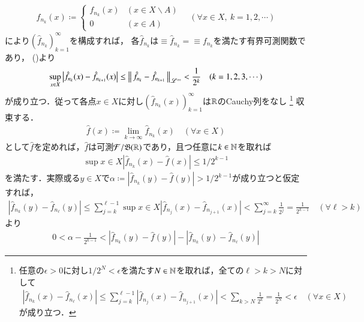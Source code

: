 \begin{prf}
\begin{description}
\begin{align}
				\hat{f}_{n_k}(x) \coloneqq
				\begin{cases}
					f_{n_k}(x) & (x \in X \backslash A) \\
					0 & (x \in A)
				\end{cases}
				\quad (\forall x \in X,\ k=1,2,\cdots)
			\end{align}
			により$\left( \hat{f}_{n_k} \right)_{k=1}^{\infty}$を構成すれば，
			各$\hat{f}_{n_k}$は$\equiv{\hat{f}_{n_k}}{} = \equiv{f_{n_k}}{}$を満たす有界可測関数であり，
			()より
			\begin{align}
				\operatorname*{sup}_{x \in X} \left|\hat{f}_{n_k}(x) - \hat{f}_{n_{k+1}}(x)\right|
				\leq \left\|\, \hat{f}_{n_k} - \hat{f}_{n_{k+1}}\, \right\|_{\mathscr{L}^\infty} < \frac{1}{2^k} \quad (k=1,2,3,\cdots) 
				\label{ineq:Lp_banach_1}
			\end{align}
			が成り立つ．従って各点$x \in X$に対し$\left( \hat{f}_{n_k}(x) \right)_{k=1}^{\infty}$は$\mathbb{R}$のCauchy列をなし
			\footnote{
				任意の$\epsilon > 0$に対し$1/2^N < \epsilon$を満たす$N \in \mathbb{N}$を取れば，全ての$\ell > k > N$に対して
				\begin{align}
					\left|\hat{f}_{n_k}(x) - \hat{f}_{n_{\ell}}(x)\right| 
					\leq \sum_{j=k}^{\ell-1}\left|\hat{f}_{n_j}(x) - \hat{f}_{n_{j+1}}(x)\right| 
					< \sum_{k > N} \frac{1}{2^k} = \frac{1}{2^N} < \epsilon
					\quad (\forall x \in X)
				\end{align}
				が成り立つ．
			}
			収束する．
			\begin{align}
				\hat{f}(x) \coloneqq \lim_{k \to \infty} \hat{f}_{n_k}(x)
				\quad (\forall x \in X)
			\end{align}
			として$\hat{f}$を定めれば，$\hat{f}$は可測$\mathcal{F}/\mathfrak{B}(\mathbb{R})$であり，且つ任意に$k \in \mathbb{N}$を取れば
			\begin{align}
				\sup{x \in X}{|\hat{f}_{n_k}(x) - \hat{f}(x)|} \leq 1/2^{k-1} \label{ineq:Lp_banach_3}
			\end{align}
			を満たす．実際或る$y \in X$で$\alpha \coloneqq |\hat{f}_{n_k}(y) - \hat{f}(y)| > 1/2^{k-1}$が成り立つと仮定すれば，
			\begin{align}
				\left| \hat{f}_{n_k}(y) - \hat{f}_{n_\ell}(y) \right|
				\leq \sum_{j=k}^{\ell-1} \sup{x \in X}{\left|\hat{f}_{n_j}(x) - \hat{f}_{n_{j+1}}(x)\right|}
				< \sum_{j=k}^{\infty} \frac{1}{2^j}
				= \frac{1}{2^{k-1}}
				\quad (\forall \ell > k)
			\end{align}
			より
			\begin{align}
				0 < \alpha - \frac{1}{2^{k-1}} < \left| \hat{f}_{n_k}(y) - \hat{f}(y) \right| - \left| \hat{f}_{n_k}(y) - \hat{f}_{n_\ell}(y) \right|

\end{align}
\end{description}
\end{prf}
